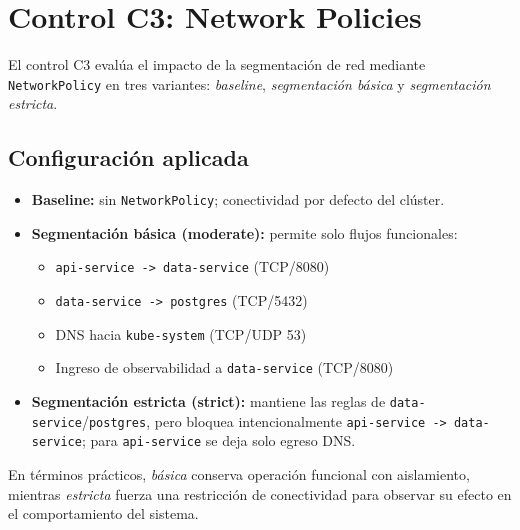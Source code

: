 
\section{Control C3: Network Policies}
\label{sec:c3-network-policies}

El control C3 eval\'ua el impacto de la segmentaci\'on de red mediante \texttt{NetworkPolicy} en tres variantes: \textit{baseline}, \textit{segmentaci\'on b\'asica} y \textit{segmentaci\'on estricta}.

\subsection{Configuraci\'on aplicada}

\begin{itemize}
  \item \textbf{Baseline:} sin \texttt{NetworkPolicy}; conectividad por defecto del cl\'uster.

  \item \textbf{Segmentaci\'on b\'asica (moderate):} permite solo flujos funcionales:
  \begin{itemize}
    \item \texttt{api-service -> data-service} (TCP/8080)
    \item \texttt{data-service -> postgres} (TCP/5432)
    \item DNS hacia \texttt{kube-system} (TCP/UDP 53)
    \item Ingreso de observabilidad a \texttt{data-service} (TCP/8080)
  \end{itemize}

  \item \textbf{Segmentaci\'on estricta (strict):} mantiene las reglas de \texttt{data-service}/\texttt{postgres}, pero bloquea intencionalmente \texttt{api-service -> data-service}; para \texttt{api-service} se deja solo egreso DNS.
\end{itemize}

En t\'erminos pr\'acticos, \textit{b\'asica} conserva operaci\'on funcional con aislamiento, mientras \textit{estricta} fuerza una restricci\'on de conectividad para observar su efecto en el comportamiento del sistema.
